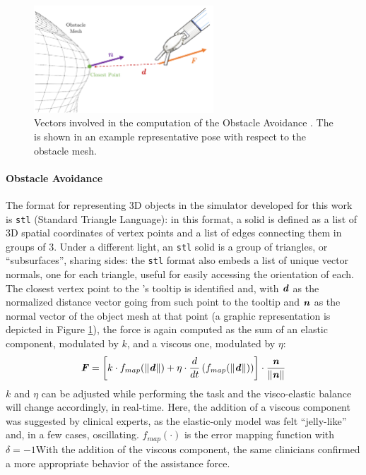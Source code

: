\documentclass[../main.tex]{subfiles}
\begin{document}
\begin{figure}
    \centering
    \includegraphics[width=0.6\textwidth]{images/obstacle_avoidance.png}
    \caption{Vectors involved in the computation of the Obstacle Avoidance \vf. The \psm is shown in an example representative pose with respect to the obstacle mesh.}
    \label{fig:obstacleavoidance}
\end{figure}

\paragraph{Obstacle Avoidance} The format for representing 3D objects in the simulator developed for this work is \texttt{stl} (Standard Triangle Language): in this format, a solid is defined as a list of 3D spatial coordinates of vertex points and a list of edges connecting them in groups of 3. Under a different light, an \texttt{stl} solid is a group of triangles, or ``subsurfaces'', sharing sides: the \texttt{stl} format also embeds a list of unique vector normals, one for each triangle, useful for easily accessing the orientation of each. The closest vertex point to the \psm's tooltip is identified and, with $\textbf{\textit{d}}$ as the normalized distance vector going from such point to the tooltip and $\textbf{\textit{n}}$ as the normal vector of the object mesh at that point (a graphic representation is depicted in Figure \ref{fig:obstacleavoidance}), the force is again computed as the sum of an elastic component, modulated by $k$, and a viscous one, modulated by $\eta$:
\begin{equation}
    \textbf{\textit{F}} = \left[k\cdot f_{map}(\|\textbf{\textit{d}}\|) + \eta\cdot \frac{d}{dt} \left( f_{map}(\|\textbf{\textit{d}}\|)\right)\right]\cdot \frac{\textbf{\textit{n}}}{\|\textbf{\textit{n}}\|} 
    \label{eq:obstacleavoidancef}
\end{equation}
$k$ and $\eta$ can be adjusted while performing the task and the visco-elastic balance will change accordingly, in real-time. Here, the addition of a viscous component was suggested by clinical experts, as the elastic-only model was felt ``jelly-like'' and, in a few cases, oscillating. $f_{map}(\cdot)$ is the error mapping function with $\delta=-1$With the addition of the viscous component, the same clinicians confirmed a more appropriate behavior of the assistance force.
\end{document}
